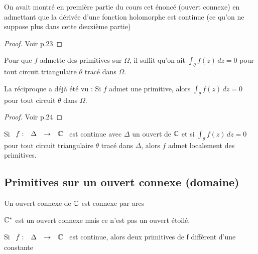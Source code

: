 \documentclass[]{report}
\begin{document}
\begin{re}
    On avait montré en première partie du cours cet énoncé (ouvert connexe) en admettant que la dérivée d'une fonction holomorphe est continue (ce qu'on ne suppose plus dans cette deuxième partie)
\end{re}

\begin{proof}
    Voir p.23
\end{proof}

\begin{prop}
    Pour que $f$ admette des primitives sur $\Omega$, il suffit qu'on ait $\displaystyle{\int_\theta f(z)\,dz=0}$ pour tout circuit triangulaire $\theta$ tracé dans $\Omega$.
\end{prop}

\begin{re}
    La réciproque a déjà été vu : Si $f$ admet une primitive, alors $\displaystyle{\int_\theta f(z)\,dz=0}$ pour tout circuit $\theta$ dans $\Omega$.
\end{re}

\begin{proof}
    Voir p.24
\end{proof}

\begin{cor}
    Si $\begin{array}{ccccc}
f : & \Delta & \to & \mathbb{C}
\end{array}$ est continue avec $\Delta$ un ouvert de $\mathbb{C}$ et si $\displaystyle{\int_\theta}f(z)\,dz=0$ pour tout circuit triangulaire $\theta$ tracé dans $\Delta$, alors $f$ admet localement des primitives.
\end{cor}

\subsection{Primitives sur un ouvert connexe (domaine)}

\begin{ra}
    Un ouvert connexe de $\mathbb{C}$ est connexe par arcs
\end{ra}

\begin{ex}
    $\mathbb{C}^*$ est un ouvert connexe mais ce n'est pas un ouvert étoilé.
\end{ex}

\begin{lm}
    Si $\begin{array}{ccccc}
f : & \Delta & \to & \mathbb{C}
\end{array}$ est continue, alors deux primitives de f diffèrent d'une constante
\end{lm}
\end{document}
